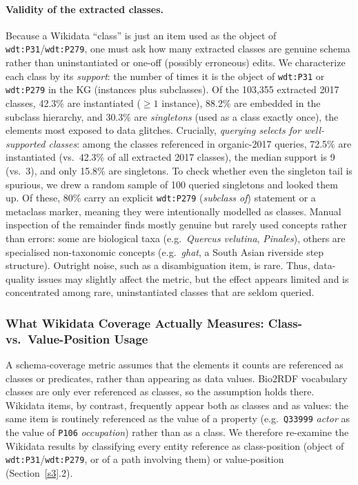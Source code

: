 \documentclass[sw]{iosart2x}
\begin{document}
\paragraph{\textbf{Validity of the extracted classes.}} Because a Wikidata ``class'' is just an item used as the object of \texttt{wdt:P31}/\texttt{wdt:P279}, one must ask how many extracted classes are genuine schema rather than uninstantiated or one-off (possibly erroneous) edits. We characterize each class by its \emph{support}: the number of times it is the object of \texttt{wdt:P31} or \texttt{wdt:P279} in the KG (instances plus subclasses). Of the 103{,}355 extracted 2017 classes, 42.3\% are instantiated ($\geq 1$ instance), 88.2\% are embedded in the subclass hierarchy, and 30.3\% are \emph{singletons} (used as a class exactly once), the elements most exposed to data glitches. Crucially, \emph{querying selects for well-supported classes}: among the classes referenced in organic-2017 queries, 72.5\% are instantiated (vs.\ 42.3\% of all extracted 2017 classes), the median support is 9 (vs.\ 3), and only 15.8\% are singletons. To check whether even the singleton tail is spurious, we drew a random sample of 100 queried singletons and looked them up. Of these, 80\% carry an explicit \texttt{wdt:P279} (\emph{subclass of}) statement or a metaclass marker, meaning they were intentionally modelled as classes. Manual inspection of the remainder finds mostly genuine but rarely used concepts rather than errors: some are biological taxa (e.g.\ \emph{Quercus velutina}, \emph{Pinales}), others are specialised non-taxonomic concepts (e.g.\ \emph{ghat}, a South Asian riverside step structure). Outright noise, such as a disambiguation item, is rare. Thus, data-quality issues may slightly affect the metric, but the effect appears limited and is concentrated among rare, uninstantiated classes that are seldom queried.

\subsubsection{What Wikidata Coverage Actually Measures: Class- vs.\ Value-Position Usage}\label{sec:classvalue}
A schema-coverage metric assumes that the elements it counts are referenced as classes or predicates, rather than appearing as data values. Bio2RDF vocabulary classes are only ever referenced as classes, so the assumption holds there. Wikidata items, by contrast, frequently appear both as classes and as values: the same item is routinely referenced as the value of a property (e.g.\ \texttt{Q33999} \emph{actor} as the value of \texttt{P106} \emph{occupation}) rather than as a class. We therefore re-examine the Wikidata results by classifying every entity reference as class-position (object of \texttt{wdt:P31}/\texttt{wdt:P279}, or of a path involving them) or value-position (Section~\ref{s3}.2).
\end{document}
